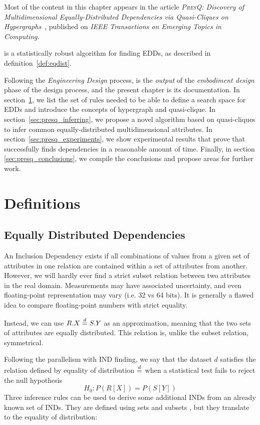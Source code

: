 
Most of the content in this chapter appears in the article
\emph{\textsc{PresQ}: Discovery of Multidimensional Equally-Distributed Dependencies via Quasi-Cliques on Hypergraphs}~\cite{AlvarezAyllonPresQ2022},
published on \emph{IEEE Transactions on Emerging Topics in Computing}.

\medskip

\PresQ is a statistically robust algorithm for finding \glspl{EDD}, as described
in definition~\ref{def:eqdist}.

Following the \emph{Engineering Design} process, \PresQ is the \emph{output} of
the \emph{embodiment design} phase of the design process, and the present chapter
is its documentation.
In section~\ref{sec:presq_definitions}, we list the set of rules needed to be able
to define a search space for \glspl{EDD} and introduce the concepts of
hypergraph and quasi-clique. In section~\ref{sec:presq_inferring}, we propose
a novel algorithm based on quasi-cliques to infer common equally-distributed
multidimensional attributes.
In section~\ref{sec:presq_experiments}, we show experimental results
that prove that \PresQ successfully finds dependencies in a reasonable amount of time.
Finally, in section \ref{sec:presq_conclusions}, we compile the conclusions and
propose areas for further work.

\section{Definitions}
\label{sec:presq_definitions}

\subsection{Equally Distributed Dependencies}
\label{sec:edd}
An Inclusion Dependency exists if all combinations of
values from a given set of attributes in one relation are contained within
a set of attributes from another.
However, we will hardly ever find a strict
subset relation between two attributes in the real domain. Measurements may have associated uncertainty,
and even floating-point representation may vary (i.e. 32 vs 64 bits). It is generally a
flawed idea to compare floating-point numbers with strict equality.

Instead, we can use $R.X \stackrel{d}{=} S.Y$ as an approximation, meaning that the two sets of
attributes are equally distributed. This relation is, unlike the subset relation, symmetrical.

Following the parallelism with \gls{IND} finding, we say that the dataset $d$ satisfies
the relation defined by equality of distribution $\stackrel{d}{=}$ when a statistical test
fails to reject the null hypothesis
\begin{equation}
    H_0: P(R[X]) = P(S[Y])
    \label{eq:eqdist}
\end{equation}
Three inference rules can be used to derive some additional \glspl{IND} from an already known
set of \glspl{IND}. They are defined using sets and subsets \cite{Casanova1984},
but they translate to the equality of distribution:

